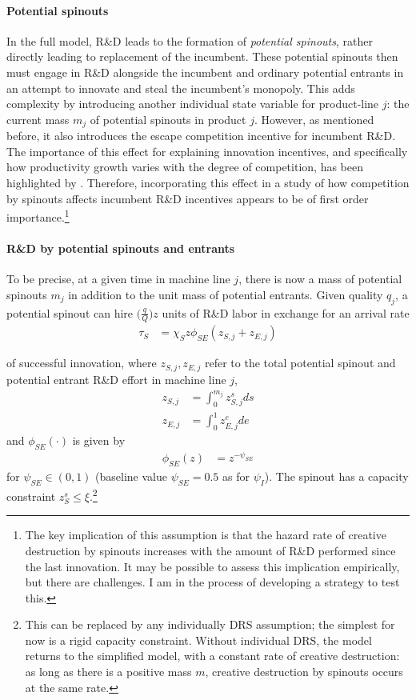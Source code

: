 \documentclass[11pt,english]{article}
\theoremstyle{remark}
\begin{document}
\paragraph{Potential spinouts}

In the full model, R\&D leads to the formation of \textit{potential spinouts}, rather directly leading to replacement of the incumbent. These potential spinouts then must engage in R\&D alongside the incumbent and ordinary potential entrants in an attempt to innovate and steal the incumbent's monopoly. This adds complexity by introducing another individual state variable for product-line $j$: the current mass $m_j$ of potential spinouts in product $j$. However, as mentioned before, it also introduces the escape competition incentive for incumbent R\&D. The importance of this effect for explaining innovation incentives, and specifically how productivity growth varies with the degree of competition, has been highlighted by \cite{aghion_competition_2005}. Therefore, incorporating this effect in a study of how competition by spinouts affects incumbent R\&D incentives appears to be of first order importance.\footnote{The key implication of this assumption is that the hazard rate of creative destruction by spinouts increases with the amount of R\&D performed since the last innovation. It may be possible to assess this implication empirically, but there are challenges. I am in the process of developing a strategy to test this.}

\paragraph{R\&D by potential spinouts and entrants}

To be precise, at a given time in machine line $j$, there is now a mass of potential spinouts $m_j$ in addition to the unit mass of potential entrants. Given quality $q_j$, a potential spinout can hire $\Big( \frac{q}{Q}\Big) z$ units of R\&D labor in exchange for an arrival rate
\begin{align}
	\tau_S &= \chi_S z \phi_{SE} (z_{S,j} + z_{E,j})  
\end{align}

of successful innovation, where $z_{S,j},z_{E,j}$ refer to the total potential spinout and potential entrant R\&D effort in machine line $j$,
\begin{align}
	z_{S,j} &= \int_0^{m_j} z_{S,j}^s ds \\
	z_{E,j} &= \int_0^1 z_{E,j}^e de
\end{align}
and $\phi_{SE}(\cdot) $ is given by 
\begin{align}
	\phi_{SE} (z) &= z^{-\psi_{SE}}
\end{align} 
for $\psi_{SE} \in (0,1)$ (baseline value $\psi_{SE} = 0.5$ as for $\psi_I$). The spinout has a capacity constraint $z_S^s \le \xi$.\footnote{This can be replaced by any individually DRS assumption; the simplest for now is a rigid capacity constraint. Without individual DRS, the model returns to the simplified model, with a constant rate of creative destruction: as long as there is a positive mass $m$, creative destruction by spinouts occurs at the same rate.}
\end{document}
